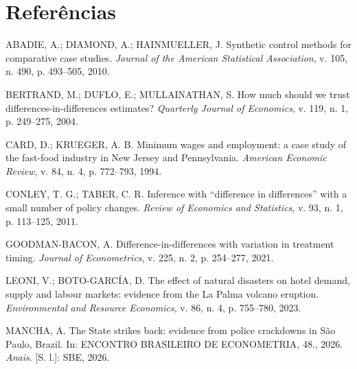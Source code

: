 \documentclass[12pt,a4paper]{article}
\newenvironment{referencias}{%
  \section*{Referências}
  \begin{singlespace}\footnotesize
  \setlength{\parindent}{0pt}
  \setlength{\parskip}{2pt}
  \raggedright
}{%
  \end{singlespace}
}
\begin{document}
\begin{referencias}
ABADIE, A.; DIAMOND, A.; HAINMUELLER, J. Synthetic control methods for comparative case studies.
\textit{Journal of the American Statistical Association}, v. 105, n. 490, p. 493--505, 2010.

BERTRAND, M.; DUFLO, E.; MULLAINATHAN, S. How much should we trust differences-in-differences
estimates? \textit{Quarterly Journal of Economics}, v. 119, n. 1, p. 249--275, 2004.

CARD, D.; KRUEGER, A. B. Minimum wages and employment: a case study of the fast-food industry in New
Jersey and Pennsylvania. \textit{American Economic Review}, v. 84, n. 4, p. 772--793, 1994.

CONLEY, T. G.; TABER, C. R. Inference with ``difference in differences'' with a small number of
policy changes. \textit{Review of Economics and Statistics}, v. 93, n. 1, p. 113--125, 2011.

GOODMAN-BACON, A. Difference-in-differences with variation in treatment timing. \textit{Journal of
Econometrics}, v. 225, n. 2, p. 254--277, 2021.

LEONI, V.; BOTO-GARCÍA, D. The effect of natural disasters on hotel demand, supply and labour
markets: evidence from the La Palma volcano eruption. \textit{Environmental and Resource Economics},
v. 86, n. 4, p. 755--780, 2023.

MANCHA, A. The State strikes back: evidence from police crackdowns in São Paulo, Brazil. In: ENCONTRO
BRASILEIRO DE ECONOMETRIA, 48., 2026. \textit{Anais}. [S. l.]: SBE, 2026.
\end{referencias}
\end{document}
